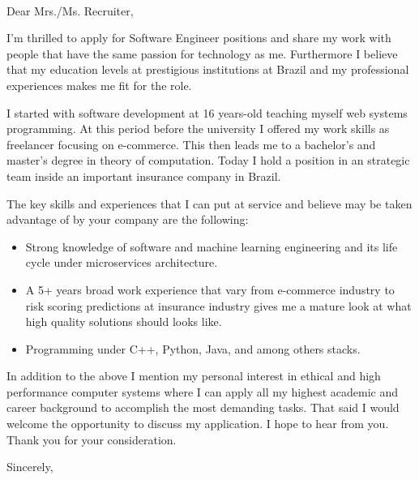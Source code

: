 \documentclass{scrlttr2}
\begin{document}
\renewcommand{\enclname}{Enclosures}

\begin{letter}{~ %
  }
  
  \opening{Dear Mrs./Ms. Recruiter,}

  I'm thrilled to apply for Software Engineer positions and
  share my work with people that have the same passion for technology as
  me. Furthermore I believe that my education levels at prestigious
  institutions at Brazil and my professional experiences makes me fit for the
  role.

  I started with software development at 16 years-old teaching myself web
  systems programming. At this period before the university I offered my work
  skills as freelancer focusing on e-commerce. This then leads me to a
  bachelor's and master's degree in theory of computation. Today I hold a
  position in an strategic team inside an important insurance company in Brazil.

  The key skills and experiences that I can put at service and believe may be
  taken advantage of by your company are the following:

  \begin{itemize}
  \item Strong knowledge of software and machine learning engineering and its
    life cycle under microservices architecture.
  \item A 5+ years broad work experience that vary from e-commerce industry to
    risk scoring predictions at insurance industry gives me a mature look at
    what high quality solutions should looks like.
  \item Programming under C++, Python, Java, and among others stacks.
  \end{itemize}

  In addition to the above I mention my personal interest in ethical and high
  performance computer systems where I can apply all my highest academic and
  career background to accomplish the most demanding tasks. That said I would
  welcome the opportunity to discuss my application. I hope to hear from
  you. Thank you for your consideration.

  \closing{Sincerely,}


\end{letter}
\end{document}
